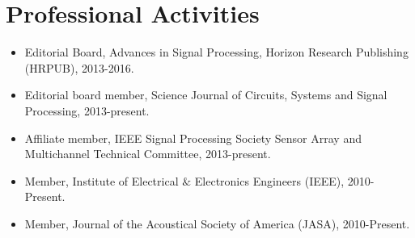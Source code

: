 \documentclass[11pt]{article}
\begin{document}
\section*{Professional Activities}
%
\begin{itemize}
%
\item Editorial Board, Advances in Signal Processing, Horizon Research Publishing (HRPUB), 2013-2016.
\item Editorial board member, Science Journal of Circuits, Systems and Signal Processing, 2013-present.
\item Affiliate member, IEEE Signal Processing Society Sensor Array and Multichannel Technical Committee, 2013-present.
\item Member, Institute of Electrical $\&$ Electronics Engineers (IEEE), 2010-Present.
\item Member, Journal of the Acoustical Society of America (JASA), 2010-Present.
\end{itemize}
\end{document}
